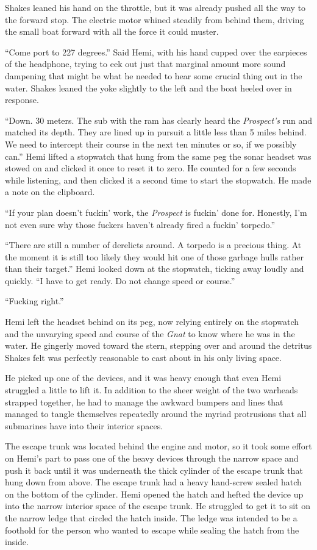\documentclass[]{scrbook}
\begin{document}
Shakes leaned his hand on the throttle, but it was already pushed all
the way to the forward stop. The electric motor whined steadily from
behind them, driving the small boat forward with all the force it could
muster.

``Come port to 227 degrees.'' Said Hemi, with his hand cupped over the
earpieces of the headphone, trying to eek out just that marginal amount
more sound dampening that might be what he needed to hear some crucial
thing out in the water. Shakes leaned the yoke slightly to the left and
the boat heeled over in response.

``Down. 30 meters. The sub with the ram has clearly heard the
\emph{Prospect's} run and matched its depth. They are lined up in
pursuit a little less than 5 miles behind. We need to intercept their
course in the next ten minutes or so, if we possibly can.'' Hemi lifted
a stopwatch that hung from the same peg the sonar headset was stowed on
and clicked it once to reset it to zero. He counted for a few seconds
while listening, and then clicked it a second time to start the
stopwatch. He made a note on the clipboard.

``If your plan doesn't fuckin' work, the \emph{Prospect} is fuckin' done
for. Honestly, I'm not even sure why those fuckers haven't already fired
a fuckin' torpedo.''

``There are still a number of derelicts around. A torpedo is a precious
thing. At the moment it is still too likely they would hit one of those
garbage hulls rather than their target.'' Hemi looked down at the
stopwatch, ticking away loudly and quickly. ``I have to get ready. Do
not change speed or course.''

``Fucking right.''

Hemi left the headset behind on its peg, now relying entirely on the
stopwatch and the unvarying speed and course of the \emph{Gnat} to know
where he was in the water. He gingerly moved toward the stern, stepping
over and around the detritus Shakes felt was perfectly reasonable to
cast about in his only living space.

He picked up one of the devices, and it was heavy enough that even Hemi
struggled a little to lift it. In addition to the sheer weight of the
two warheads strapped together, he had to manage the awkward bumpers and
lines that managed to tangle themselves repeatedly around the myriad
protrusions that all submarines have into their interior spaces.

The escape trunk was located behind the engine and motor, so it took
some effort on Hemi's part to pass one of the heavy devices through the
narrow space and push it back until it was underneath the thick cylinder
of the escape trunk that hung down from above. The escape trunk had a
heavy hand-screw sealed hatch on the bottom of the cylinder. Hemi opened
the hatch and hefted the device up into the narrow interior space of the
escape trunk. He struggled to get it to sit on the narrow ledge that
circled the hatch inside. The ledge was intended to be a foothold for
the person who wanted to escape while sealing the hatch from the inside.
\end{document}
